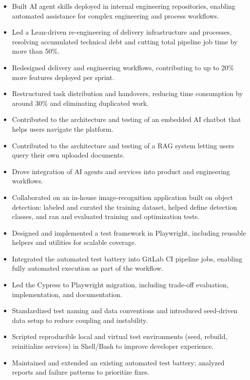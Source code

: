 \documentclass[10pt,a4paper]{article}
\begin{document}
\begin{itemize}
\item Built AI agent skills deployed in internal engineering repositories, enabling automated assistance for complex engineering and process workflows.
\item Led a Lean-driven re-engineering of delivery infrastructure and processes, resolving accumulated technical debt and cutting total pipeline job time by more than 50\%.
\item Redesigned delivery and engineering workflows, contributing to up to 20\% more features deployed per sprint.
\item Restructured task distribution and handovers, reducing time consumption by around 30\% and eliminating duplicated work.
\item Contributed to the architecture and testing of an embedded AI chatbot that helps users navigate the platform.
\item Contributed to the architecture and testing of a RAG system letting users query their own uploaded documents.
\item Drove integration of AI agents and services into product and engineering workflows.
\item Collaborated on an in-house image-recognition application built on object detection: labeled and curated the training dataset, helped define detection classes, and ran and evaluated training and optimization tests.
\item Designed and implemented a test framework in Playwright, including reusable helpers and utilities for scalable coverage.
\item Integrated the automated test battery into GitLab CI pipeline jobs, enabling fully automated execution as part of the workflow.
\item Led the Cypress to Playwright migration, including trade-off evaluation, implementation, and documentation.
\item Standardized test naming and data conventions and introduced seed-driven data setup to reduce coupling and instability.
\item Scripted reproducible local and virtual test environments (seed, rebuild, reinitialize services) in Shell/Bash to improve developer experience.
\item Maintained and extended an existing automated test battery; analyzed reports and failure patterns to prioritize fixes.
\end{itemize}
\end{document}

